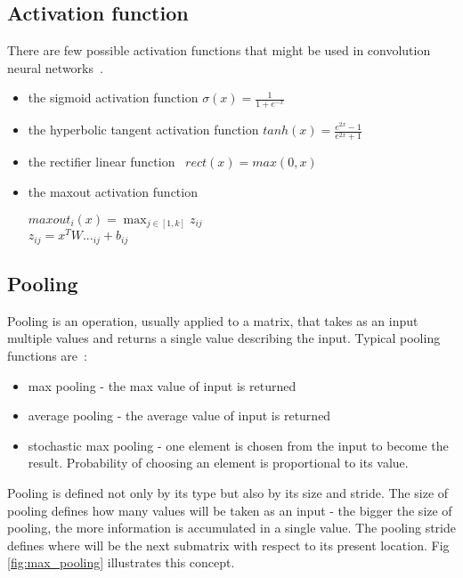 \documentclass[a4paper,10pt]{report}
\begin{document}
	\subsection{Activation function}\label{sec:ACTIVATION_FUNCTIONS}
	  There are few possible activation functions that might be used in convolution neural networks~\cite{DUTCH}.
	  \begin{itemize}
	   \item the sigmoid activation function $\sigma(x) = \frac{1}{1 + e^{-x}}$
	   \item the hyperbolic tangent activation function $tanh(x) = \frac{e^{2x} - 1}{e^{2x} + 1}$
	   \item the rectifier linear function~\cite{GLOROT_BENGIO} $rect(x) = max(0,x)$
	   \item the maxout activation function
	    \begin{center}
	      $maxout_i(x) = \max_{j \in [1, k]}z_{ij}$\\
	      $z_{ij}=x^TW..._{ij} + b_{ij} $ %
	    \end{center}
	  \end{itemize}

	
	\subsection{Pooling}
	  Pooling is an operation, usually applied to a matrix, that takes as an input multiple values and returns a single value describing the input. Typical pooling functions are~\cite{DUTCH}:
	  \begin{itemize}
	    \item max pooling - the max value of input is returned
	    \item average pooling - the average value of input is returned
	    \item stochastic max pooling - one element is chosen from the input to become the result. Probability of choosing an element is proportional to its value.~\cite{ZEILER}\\
	  \end{itemize}
	  
	  Pooling is defined not only by its type but also by its size and stride. The size of pooling defines how many values will be taken as an input - the bigger the size of pooling, the more information is accumulated in a single value. The pooling stride defines where will be the next submatrix with respect to its present location. Fig \ref{fig:max_pooling} illustrates this concept.\\
	  
\end{document}
